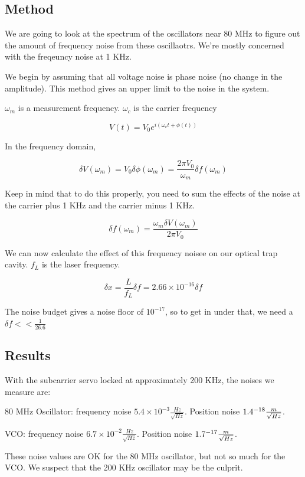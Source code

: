 \subsection{Method}

We are going to look at the spectrum of the oscillators near 80 MHz to figure out the amount of frequency noise from these oscillaotrs.  We're mostly concerned with the freqeuncy noise at 1 KHz.

We begin by assuming that all voltage noise is phase noise (no change in the amplitude).  This method gives an upper limit to the noise in the system.

$\omega_m$ is a measurement frequency.  $\omega_c$ is the carrier frequency

$$V(t) = V_0 e^{i(\omega_c t + \phi(t))}$$

In the frequency domain,

$$\delta V(\omega_m) = V_0 \delta \phi(\omega_m) = \frac{2\pi V_0}{\omega_m} \delta f(\omega_m)$$

Keep in mind that to do this properly, you need to sum the effects of the noise at the carrier plus 1 KHz and the carrier minus 1 KHz.


$$\delta f(\omega_m)= \frac{\omega_m \delta V(\omega_m)}{2 \pi V_0} $$

We can now calculate the effect of this frequency noisee on our optical trap cavity.  $f_L$ is the laser frequency.

$$\delta x = \frac{L}{f_L} \delta f = 2.66\times10^{-16} \delta f$$

The noise budget gives a noise floor of $10^{-17}$, so to get in under that, we need a $\delta f <<\frac{1}{26.6}$


\subsection{Results}

With the subcarrier servo locked at approximately 200 KHz, the noises we measure are:

80 MHz Oscillator: frequency noise $5.4\times10^{-3} \frac{Hz}{\sqrt{Hz}}$.  Position noise $1.4\time10^{-18} \frac{m}{\sqrt{Hz}}$.

VCO: frequency noise $6.7\times10^{-2} \frac{Hz}{\sqrt{Hz}}$.  Position noise $1.7\time10^{-17} \frac{m}{\sqrt{Hz}}$.

These noise values are OK for the 80 MHz oscillator, but not so much for the VCO.  We suspect that the 200 KHz oscillator may be the culprit.



